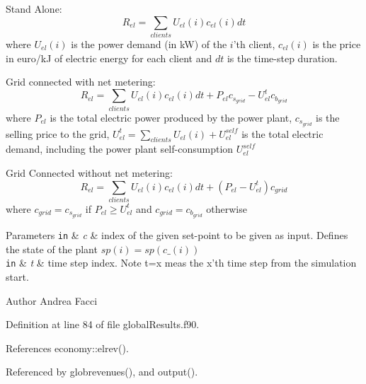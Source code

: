 \begin{DoxyItemize}
\item Stand Alone\-: \[ R_{el} = \sum_{clients} U_{el}(i)c_{el}(i)dt \] where $ U_{el}(i)$ is the power demand (in k\-W) of the $i$'th client, $c_{el}(i)$ is the price in euro/k\-J of electric energy for each client and $ dt$ is the time-\/step duration.\par

\item Grid connected with net metering\-: \[ R_{el} = \sum_{clients} U_{el}(i)c_{el}(i)dt + P_{el}c_{s_{grid}} - U_{el}^{t}c_{b_{grid}} \] where $P_{el}$ is the total electric power produced by the power plant, $c_{s_{grid}}$ is the selling price to the grid, $U_{el}^{t} = \sum_{clients} U_{el}(i) + U_{el}^{self} $ is the total electric demand, including the power plant self-\/consumption $U_{el}^{self}$\par

\item Grid Connected without net metering\-: \[ R_{el} = \sum_{clients} U_{el}(i)c_{el}(i)dt + (P_{el} - U_{el}^{t}) c_{grid} \] where $ c_{grid} = c_{s_{grid}}$ if $P_{el} \ge U_{el}^{t}$ and $ c_{grid} = c_{b_{grid}}$ otherwise 
\begin{DoxyParams}[1]{Parameters}
\mbox{\tt in}  & {\em c} & index of the given set-\/point to be given as input. Defines the state of the plant $sp(i) = sp(c\_(i))$ \\
\hline
\mbox{\tt in}  & {\em t} & time step index. Note t=x meas the x'th time step from the simulation start. \\
\hline
\end{DoxyParams}
\begin{DoxyAuthor}{Author}
Andrea Facci 
\end{DoxyAuthor}

\end{DoxyItemize}

Definition at line 84 of file global\-Results.\-f90.



References economy\-::elrev().



Referenced by globrevenues(), and output().

